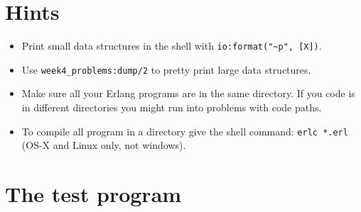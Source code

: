 \documentclass[12pt]{article}
\begin{document}
\section{Hints}

\begin{itemize}

\item Print small data structures in the shell with \verb+io:format("~p", [X])+.

\item Use \verb+week4_problems:dump/2+ to pretty print large data structures.

\item Make sure all your Erlang programs are in the same directory.
If you code is in different directories you might run into problems with code paths.

\item To compile all program in a directory give the shell command:
\verb+erlc *.erl+ (OS-X and Linux only, not windows).
\end{itemize}


\section{The test program}

\end{document}
